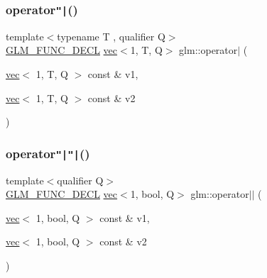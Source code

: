 \subsubsection{\texorpdfstring{operator\texttt{"|}()}{operator|()}\hspace{0.1cm}{\footnotesize\ttfamily [3/3]}}
{\footnotesize\ttfamily template$<$typename T , qualifier Q$>$ \\
\mbox{\hyperlink{setup_8hpp_ab2d052de21a70539923e9bcbf6e83a51}{G\+L\+M\+\_\+\+F\+U\+N\+C\+\_\+\+D\+E\+CL}} \mbox{\hyperlink{structglm_1_1vec}{vec}}$<$1, T, Q$>$ glm\+::operator$\vert$ (\begin{DoxyParamCaption}\item[{\mbox{\hyperlink{structglm_1_1vec}{vec}}$<$ 1, T, Q $>$ const \&}]{v1,  }\item[{\mbox{\hyperlink{structglm_1_1vec}{vec}}$<$ 1, T, Q $>$ const \&}]{v2 }\end{DoxyParamCaption})}

\mbox{\label{group__ext__vec1_ga121908a337ee4ab94414dfd4f3518d47}} 
\subsubsection{\texorpdfstring{operator\texttt{"|}\texttt{"|}()}{operator||()}}
{\footnotesize\ttfamily template$<$qualifier Q$>$ \\
\mbox{\hyperlink{setup_8hpp_ab2d052de21a70539923e9bcbf6e83a51}{G\+L\+M\+\_\+\+F\+U\+N\+C\+\_\+\+D\+E\+CL}} \mbox{\hyperlink{structglm_1_1vec}{vec}}$<$1, bool, Q$>$ glm\+::operator$\vert$$\vert$ (\begin{DoxyParamCaption}\item[{\mbox{\hyperlink{structglm_1_1vec}{vec}}$<$ 1, bool, Q $>$ const \&}]{v1,  }\item[{\mbox{\hyperlink{structglm_1_1vec}{vec}}$<$ 1, bool, Q $>$ const \&}]{v2 }\end{DoxyParamCaption})}

\mbox{\label{group__ext__vec1_ga923256ef3abbc940c475ddb5e2bca75b}} 
